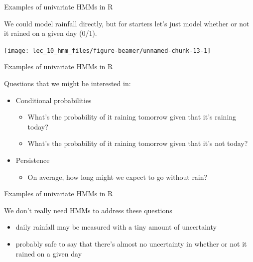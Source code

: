 \documentclass[
  ignorenonframetext,
]{beamer}
\newenvironment{Shaded}{\begin{snugshade}}{\end{snugshade}}
\newcommand{\DecValTok}[1]{\textcolor[rgb]{0.00,0.00,0.81}{#1}}
\newcommand{\KeywordTok}[1]{\textcolor[rgb]{0.13,0.29,0.53}{\textbf{#1}}}
\newcommand{\NormalTok}[1]{#1}
\newcommand{\OperatorTok}[1]{\textcolor[rgb]{0.81,0.36,0.00}{\textbf{#1}}}
\newcommand{\StringTok}[1]{\textcolor[rgb]{0.31,0.60,0.02}{#1}}
\providecommand{\tightlist}{%
  \setlength{\itemsep}{0pt}\setlength{\parskip}{0pt}}
\begin{document}
\begin{frame}[fragile]{Examples of univariate HMMs in R}
\protect\hypertarget{examples-of-univariate-hmms-in-r-1}{}

We could model rainfall directly, but for starters let's just model
whether or not it rained on a given day (0/1).

\begin{Shaded}
\end{Shaded}

\begin{center}\texttt{[image: lec\_10\_hmm\_files/figure-beamer/unnamed-chunk-13-1]} \end{center}

\end{frame}

\begin{frame}{Examples of univariate HMMs in R}
\protect\hypertarget{examples-of-univariate-hmms-in-r-2}{}

Questions that we might be interested in:

\begin{itemize}
\tightlist
\item
  Conditional probabilities

  \begin{itemize}
  \tightlist
  \item
    What's the probability of it raining tomorrow given that it's
    raining today?
  \item
    What's the probability of it raining tomorrow given that it's not
    today?
  \end{itemize}
\item
  Persistence

  \begin{itemize}
  \tightlist
  \item
    On average, how long might we expect to go without rain?
  \end{itemize}
\end{itemize}

\end{frame}

\begin{frame}{Examples of univariate HMMs in R}
\protect\hypertarget{examples-of-univariate-hmms-in-r-3}{}

We don't really need HMMs to address these questions

\begin{itemize}
\tightlist
\item
  daily rainfall may be measured with a tiny amount of uncertainty
\item
  probably safe to say that there's almost no uncertainty in whether or
  not it rained on a given day
\end{itemize}

\end{frame}
\end{document}
